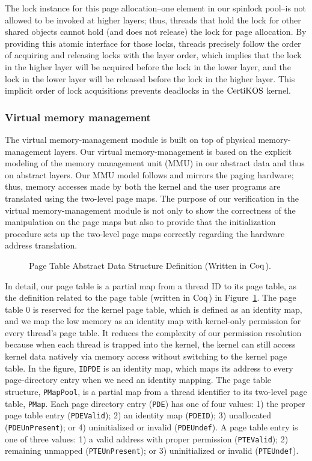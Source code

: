 The lock instance for this page allocation--one element in our spinlock pool--is not allowed to be invoked at higher layers;
thus, threads that hold the lock for other shared objects cannot hold (and does not release) the lock for page allocation.
By providing this atomic interface for those locks,
threads precisely follow the order of acquiring and releasing locks with the layer order, which implies that 
the lock in the higher layer will be acquired before the lock in the lower layer,
and the lock in the lower layer will be released before the lock in the higher layer.
This implicit order of lock acquisitions prevents deadlocks in the $\mathrm{CertiKOS}$ kernel.



\subsubsection{Virtual memory management}
The virtual memory-management module is built on top of  physical memory-management layers. 
Our virtual memory-management is
based on the explicit modeling of the memory management unit (MMU) in our abstract data and thus on abstract layers. 
Our MMU model follows and mirrors the paging hardware; thus, memory accesses made by both the kernel and the user programs are translated using the two-level page maps. 
The purpose of our verification in the virtual memory-management module is
not only to show the correctness of the manipulation on the page maps but also to provide 
that the initialization procedure sets up the two-level page maps correctly regarding the hardware address translation.

\begin{figure}
 
\caption{Page Table Abstract Data Structure Definition (Written in $\mathrm{Coq}$).}
\label{fig:chapter:certikos:page-table}
\end{figure}
In detail, our page table is a partial map from a thread ID to its page table, as the definition related to the page table (written in $\mathrm{Coq}$) in
Figure~\ref{fig:chapter:certikos:page-table}. 
The page table 0 is reserved for the kernel page table, which is defined as an identity map,
and we map the low memory as an identity map with kernel-only permission
for every thread's page table.
It reduces the complexity of our permission resolution because when each thread is trapped into the kernel,
the kernel can still access kernel data natively via memory access
without switching to the kernel page table. 
In the figure, 
\lstinline$IDPDE$ is an identity map, which maps its address to every page-directory entry when we need an identity mapping.
The page table structure, \lstinline$PMapPool$, is a partial map from a thread identifier to its two-level page table, \lstinline$PMap$.
 Each page directory entry (\lstinline$PDE$) has one of four values:
 1) the proper page table entry (\lstinline$PDEValid$); 2) an identity map (\lstinline$PDEID$); 3) unallocated (\lstinline$PDEUnPresent$); or 4) uninitialized or invalid (\lstinline$PDEUndef$). 
A page table entry is one of three values:
1)  a valid address with proper permission (\lstinline$PTEValid$); 2) remaining unmapped (\lstinline$PTEUnPresent$);
 or 3) uninitialized or invalid (\lstinline$PTEUndef$).

